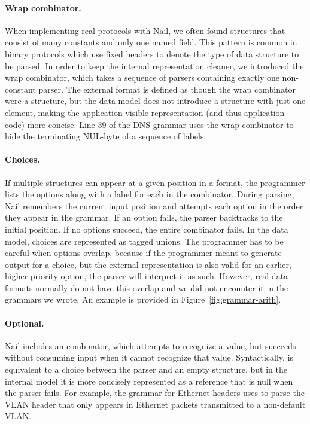 \paragraph{Wrap combinator.} 
When implementing real protocols with Nail, we often found
structures that consist of many constants and only one named field. This pattern is
common in binary protocols which use fixed headers to denote the type of data
structure to be parsed.  In order to keep the internal representation cleaner,
we introduced the wrap combinator, which takes a sequence of parsers containing
exactly one non-constant parser. The external format is defined as though the wrap combinator were a
structure, but the data model does not introduce a structure with just one element, making the application-visible representation
(and thus application code) more concise.
Line 39 of the DNS grammar uses the wrap combinator to hide the terminating NUL-byte of a sequence
of labels.


\paragraph{Choices.}
If multiple structures can appear at a given position in a format, the programmer lists the options
along with a label for each in the  combinator. 
During parsing, Nail remembers the current input position and attempts each option in the order they
appear in the grammar. If an option fails, the parser backtracks to the initial position. If no
options succeed, the entire combinator fails. In the data model, choices are represented as tagged
unions.  The programmer has to be careful when options overlap, because if the programmer meant to
generate output for a choice, but the external representation is also valid for an earlier,
higher-priority option, the parser will interpret it as such. However, real data formats normally do
not have this overlap and we did not encounter it in the grammars we wrote.
An example is provided in Figure~\ref{fig:grammar-arith}.



\paragraph{Optional.}
Nail includes an  combinator, which attempts to recognize a value, but succeeds
without consuming input when it cannot recognize that value. Syntactically,  is
equivalent to a choice between the parser and an empty structure, but in the internal model it is
more concisely represented as a reference that is null when the parser fails.
For example, the grammar for  Ethernet headers uses  to parse the VLAN
header that only appears in Ethernet packets transmitted to a non-default VLAN.

